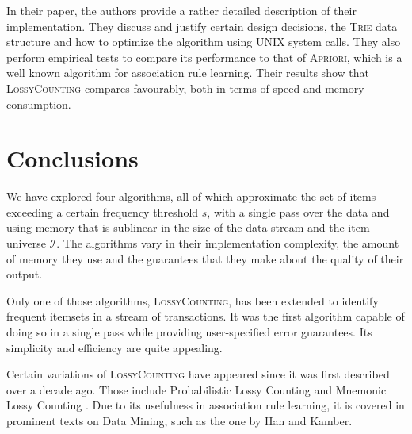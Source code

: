 \documentclass[a4paper]{article}
\begin{document}
In their paper, the authors provide a rather detailed description of their implementation. They discuss and justify certain design decisions, the \textsc{Trie} data structure and how to optimize the algorithm using UNIX system calls. They also perform empirical tests to compare its performance to that of \textsc{Apriori}, which is a well known algorithm for association rule learning. Their results show that \textsc{LossyCounting} compares favourably, both in terms of speed and memory consumption.

\section{Conclusions}
We have explored four algorithms, all of which approximate the set of items exceeding a certain frequency threshold $s$, with a single pass over the data and  using memory that is sublinear in the size of the data stream and the item universe $\mathcal{I}$. The algorithms vary in their implementation complexity, the amount of memory they use and the guarantees that they make about the quality of their output. 

Only one of those algorithms, \textsc{LossyCounting}, has been extended to identify frequent itemsets in a stream of transactions. It was the first algorithm capable of doing so in a single pass while providing user-specified error guarantees. Its simplicity and efficiency are quite appealing. 

Certain variations of \textsc{LossyCounting} have appeared since it was first described over a decade ago. Those include Probabilistic Lossy Counting \citep{dimitropoulos2008probabilistic} and Mnemonic Lossy Counting \citep{rong2010mnemonic}. Due to its usefulness in association rule learning, it is covered in prominent texts on Data Mining, such as the one by Han and Kamber.



\end{document}
